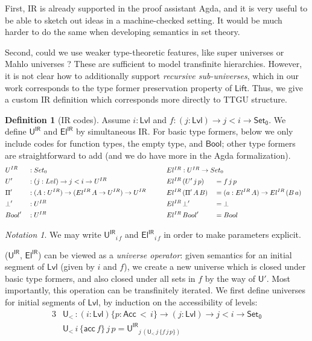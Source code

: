\documentclass[a4paper,UKenglish,cleveref, autoref, thm-restate]{lipics-v2021}
\theoremstyle{remark}
\newtheorem{notation}{Notation}
\theoremstyle{definition}
\newtheorem{mydefinition}{Definition}
\newcommand{\Set}[1]{\mathsf{Set_{#1}}}
\newcommand{\U}{\mathsf{U}}
\newcommand{\Bool}{\mathsf{Bool}}
\newcommand{\Lift}{\mathsf{Lift}}
\newcommand{\Acc}{\mathsf{Acc}}
\newcommand{\acc}{\mathsf{acc}}
\newcommand{\Lvl}{\mathsf{Lvl}}
\renewcommand{\U}{\mathsf{U}}
\newcommand{\msf}[1]{\mathsf{#1}}
\newcommand{\uir}{\msf{U^{IR}}}
\newcommand{\elir}{\msf{El^{IR}}}
\newcommand{\ult}{\U_{<}}
\begin{document}
First, IR is already supported in the proof assistant Agda, and it is very
useful to be able to sketch out ideas in a machine-checked setting. It would be
much harder to do the same when developing semantics in set theory.

Second, could we use weaker type-theoretic features, like super universes
\cite{Palmgren98onuniverses} or Mahlo universes \cite{setzer00mahlo}? These are
sufficient to model transfinite hierarchies. However, it is not clear how to
additionally support \emph{recursive sub-universes}, which in our work corresponds to
the type former preservation property of $\Lift$. Thus, we give a custom IR
definition which corresponds more directly to TTGU structure.

\begin{mydefinition}[IR codes]
  Assume $i : \Lvl$ and $f : (j : \Lvl) \to j < i \to \Set0$. We define $\uir$
  and $\elir$ by simultaneous IR. For basic type formers, below we only include
  codes for function types, the empty type, and $\Bool$; other type formers are
  straightforward to add (and we do have more in the Agda formalization).
\begin{alignat*}{5}
  & \uir   &&: \Set0
     && \rlap{$\elir : \uir \to \Set0$} \\
  & \U'    &&: (j : \Lvl) \to j < i \to \uir
     && \elir\,(\U'\,j\,p) &&= f\,j\,p \\
  & \Pi'   &&: (A : \uir) \to (\elir\,A \to \uir) \to \uir \hspace{2em}
     && \elir\,(\Pi'\,A\,B) &&= (a : \elir\,A) \to \elir\,(B\,a)\\
  & \bot' &&: \uir
     && \elir\,\bot'      &&= \bot\\
  & \Bool' &&: \uir
     && \elir\,\Bool'     &&= \Bool
\end{alignat*}
\end{mydefinition}

\begin{notation}
We may write $\uir_{i\,f}$ and $\elir_{i\,f}$ in order to make parameters explicit.
\end{notation}

($\uir$, $\elir$) can be viewed as a \emph{universe operator}: given semantics
for an initial segment of $\Lvl$ (given by $i$ and $f$), we create a new
universe which is closed under basic type formers, and also closed under all
sets in $f$ by the way of $\U'$. Most importantly, this operation can be
transfinitely iterated. We first define universes for initial segments of
$\Lvl$, by induction on the accessibility of levels:
\begin{alignat*}{3}
  & \ult\,: (i : \Lvl)\{p : \Acc\,<\,i\} \to (j : \Lvl) \to j < i \to \Set0 \\
  & \ult\,i\,\{\acc\,f\}\,j\,p = \uir_{j\,(\ult\,j\,\{f\,j\,p\})}
\end{alignat*}
\end{document}
